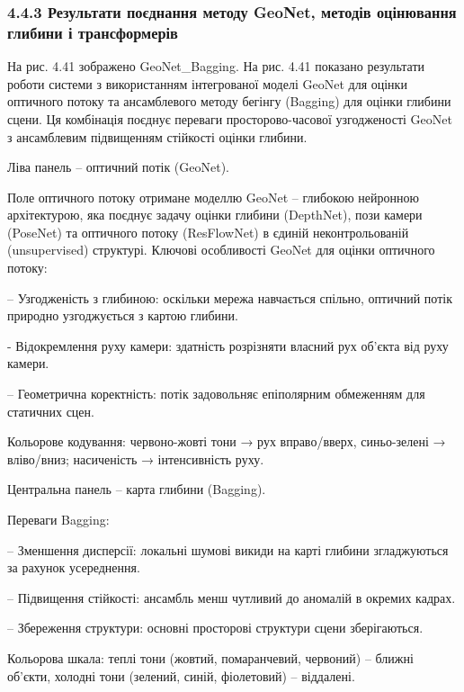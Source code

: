 \documentclass[
]{article}
\begin{document}
\subsubsection{4.4.3 Результати поєднання методу GeoNet, методів оцінювання глибини і трансформерів}\label{ux440ux435ux437ux443ux43bux44cux442ux430ux442ux438-ux43fux43eux454ux434ux43dux430ux43dux43dux44f-ux43cux435ux442ux43eux434ux443-geonet-ux43cux435ux442ux43eux434ux456ux432-ux43eux446ux456ux43dux44eux432ux430ux43dux43dux44f-ux433ux43bux438ux431ux438ux43dux438-ux456-ux442ux440ux430ux43dux441ux444ux43eux440ux43cux435ux440ux456ux432}

На рис. 4.41 зображено GeoNet\_Bagging. На рис. 4.41 показано результати роботи системи з використанням інтегрованої моделі GeoNet для оцінки оптичного потоку та ансамблевого методу бегінгу (Bagging) для оцінки глибини сцени. Ця комбінація поєднує переваги просторово-часової узгодженості GeoNet з ансамблевим підвищенням стійкості оцінки глибини.

Ліва панель -- оптичний потік (GeoNet).

Поле оптичного потоку отримане моделлю GeoNet -- глибокою нейронною архітектурою, яка поєднує задачу оцінки глибини (DepthNet), пози камери (PoseNet) та оптичного потоку (ResFlowNet) в єдиній неконтрольованій (unsupervised) структурі. Ключові особливості GeoNet для оцінки оптичного потоку:

-- Узгодженість з глибиною: оскільки мережа навчається спільно, оптичний потік природно узгоджується з картою глибини.

- Відокремлення руху камери: здатність розрізняти власний рух об'єкта від руху камери.

-- Геометрична коректність: потік задовольняє епіполярним обмеженням для статичних сцен.

Кольорове кодування: червоно-жовті тони → рух вправо/вверх, синьо-зелені → вліво/вниз; насиченість → інтенсивність руху.

Центральна панель -- карта глибини (Bagging).

Переваги Bagging:

-- Зменшення дисперсії: локальні шумові викиди на карті глибини згладжуються за рахунок усереднення.

-- Підвищення стійкості: ансамбль менш чутливий до аномалій в окремих кадрах.

-- Збереження структури: основні просторові структури сцени зберігаються.

Кольорова шкала: теплі тони (жовтий, помаранчевий, червоний) -- ближні об'єкти, холодні тони (зелений, синій, фіолетовий) -- віддалені.
\end{document}
